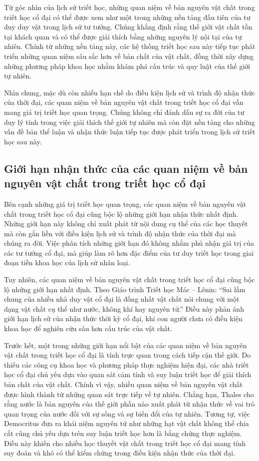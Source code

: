 \documentclass[14pt,a4paper]{extarticle}
\begin{document}
Từ góc nhìn của lịch sử triết học, những quan niệm về bản nguyên vật chất trong triết học cổ đại có thể được xem như một trong những nền tảng đầu tiên của tư duy duy vật trong lịch sử tư tưởng. Chúng khẳng định rằng thế giới vật chất tồn tại khách quan và có thể được giải thích bằng những nguyên lý nội tại của tự nhiên. Chính từ những nền tảng này, các hệ thống triết học sau này tiếp tục phát triển những quan niệm sâu sắc hơn về bản chất của vật chất, đồng thời xây dựng những phương pháp khoa học nhằm khám phá cấu trúc và quy luật của thế giới tự nhiên.

Nhìn chung, mặc dù còn nhiều hạn chế do điều kiện lịch sử và trình độ nhận thức của thời đại, các quan niệm về bản nguyên vật chất trong triết học cổ đại vẫn mang giá trị triết học quan trọng. Chúng không chỉ đánh dấu sự ra đời của tư duy lý tính trong việc giải thích thế giới tự nhiên mà còn đặt nền tảng cho những vấn đề bản thể luận và nhận thức luận tiếp tục được phát triển trong lịch sử triết học sau này.

\subsection{Giới hạn nhận thức của các quan niệm về bản nguyên vật chất trong triết học cổ đại}

Bên cạnh những giá trị triết học quan trọng, các quan niệm về bản nguyên vật chất trong triết học cổ đại cũng bộc lộ những giới hạn nhận thức nhất định. Những giới hạn này không chỉ xuất phát từ nội dung cụ thể của các học thuyết mà còn gắn liền với điều kiện lịch sử và trình độ nhận thức của thời đại mà chúng ra đời. Việc phân tích những giới hạn đó không nhằm phủ nhận giá trị của các tư tưởng cổ đại, mà giúp làm rõ hơn đặc điểm của tư duy triết học trong giai đoạn tiền khoa học của lịch sử nhân loại.

Tuy nhiên, các quan niệm về bản nguyên vật chất trong triết học cổ đại cũng bộc lộ những giới hạn nhất định. Theo Giáo trình Triết học Mác -- Lênin: ``Sai lầm chung của nhiều nhà duy vật cổ đại là đồng nhất vật chất nói chung với một dạng vật chất cụ thể như nước, không khí hay nguyên tử.''\cite{bo-gd-dt} Điều này phản ánh giới hạn lịch sử của nhận thức thời kỳ cổ đại, khi con người chưa có điều kiện khoa học để nghiên cứu sâu hơn cấu trúc của vật chất.

Trước hết, một trong những giới hạn nổi bật của các quan niệm về bản nguyên vật chất trong triết học cổ đại là tính trực quan trong cách tiếp cận thế giới. Do thiếu các công cụ khoa học và phương pháp thực nghiệm hiện đại, các nhà triết học cổ đại chủ yếu dựa vào quan sát cảm tính và suy luận triết học để giải thích bản chất của vật chất. Chính vì vậy, nhiều quan niệm về bản nguyên vật chất được hình thành từ những quan sát trực tiếp về tự nhiên. Chẳng hạn, Thales cho rằng nước là bản nguyên của thế giới phần nào xuất phát từ nhận thức về vai trò quan trọng của nước đối với sự sống và sự biến đổi của tự nhiên. Tương tự, việc Democritus đưa ra khái niệm nguyên tử như những hạt vật chất không thể chia cắt cũng chủ yếu dựa trên suy luận triết học hơn là bằng chứng thực nghiệm. Điều này khiến cho nhiều học thuyết vật chất trong triết học cổ đại mang tính suy đoán và khó có thể kiểm chứng trong điều kiện nhận thức của thời đại.
\end{document}
